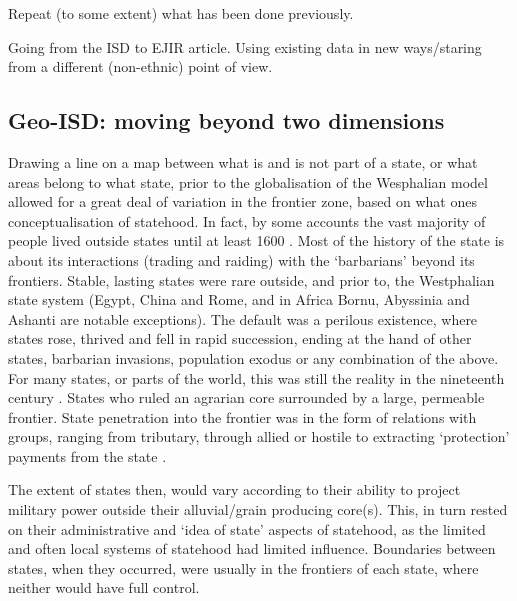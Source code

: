 


Repeat (to some extent) what has been done previously.

Going from the ISD to EJIR article. Using existing data in new ways/staring from
a different (non-ethnic) point of view.

\subsection{Geo-ISD: moving beyond two dimensions} 
\label{Geo-ISD}

Drawing a line on a map between what is and is not part of a state, or what
areas belong to what state, prior to the globalisation of the Wesphalian model
allowed for a great deal of variation in the frontier zone, based on what ones
conceptualisation of statehood. In fact, by some accounts the vast majority of
people lived outside states until at least 1600 \citep{scott2017against,
Scott2009}. Most of the history of the state is about its interactions (trading
and raiding) with the `barbarians' beyond its frontiers. Stable, lasting states
were rare outside, and prior to, the Westphalian state system (Egypt, China and
Rome, and in Africa Bornu, Abyssinia and Ashanti are notable exceptions). The
default was a perilous existence, where states rose, thrived and fell in rapid
succession, ending at the hand of other states, barbarian invasions, population
exodus or any combination of the above. For many states, or parts of the world,
this was still the reality in the nineteenth century \citep{Scott2009}. States
who ruled an agrarian core surrounded by a large, permeable frontier. State
penetration into the frontier was in the form of relations with groups, ranging
from tributary, through allied or hostile to extracting `protection' payments
from the state \citep{Scott2009}. 

The extent of states then, would vary according to their ability to project
military power outside their alluvial/grain producing core(s). This, in turn
rested on their administrative and `idea of state' aspects of statehood, as the
limited and often local systems of statehood had limited influence. Boundaries
between states, when they occurred, were usually in the frontiers of each state,
where neither would have full control.


